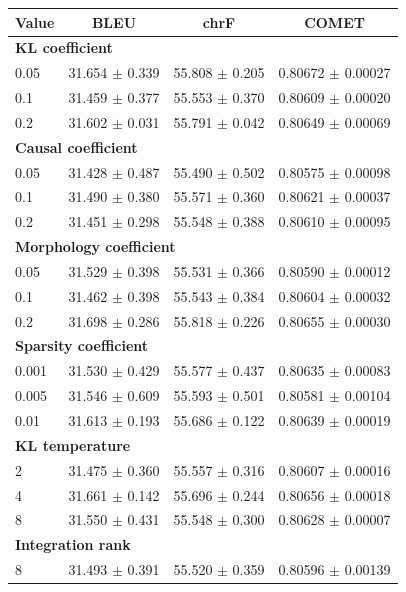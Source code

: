 \begingroup
\fontsize{7}{8.4}\selectfont
\setlength{\tabcolsep}{3pt}
\begin{tabular}{lccc}
\toprule
\textbf{Value} & \textbf{BLEU} & \textbf{chrF} & \textbf{COMET} \\
\midrule
\multicolumn{4}{l}{\textbf{KL coefficient}} \\
0.05 & 31.654 $\pm$ 0.339 & 55.808 $\pm$ 0.205 & 0.80672 $\pm$ 0.00027 \\
0.1 & 31.459 $\pm$ 0.377 & 55.553 $\pm$ 0.370 & 0.80609 $\pm$ 0.00020 \\
0.2 & 31.602 $\pm$ 0.031 & 55.791 $\pm$ 0.042 & 0.80649 $\pm$ 0.00069 \\
\multicolumn{4}{l}{\textbf{Causal coefficient}} \\
0.05 & 31.428 $\pm$ 0.487 & 55.490 $\pm$ 0.502 & 0.80575 $\pm$ 0.00098 \\
0.1 & 31.490 $\pm$ 0.380 & 55.571 $\pm$ 0.360 & 0.80621 $\pm$ 0.00037 \\
0.2 & 31.451 $\pm$ 0.298 & 55.548 $\pm$ 0.388 & 0.80610 $\pm$ 0.00095 \\
\multicolumn{4}{l}{\textbf{Morphology coefficient}} \\
0.05 & 31.529 $\pm$ 0.398 & 55.531 $\pm$ 0.366 & 0.80590 $\pm$ 0.00012 \\
0.1 & 31.462 $\pm$ 0.398 & 55.543 $\pm$ 0.384 & 0.80604 $\pm$ 0.00032 \\
0.2 & 31.698 $\pm$ 0.286 & 55.818 $\pm$ 0.226 & 0.80655 $\pm$ 0.00030 \\
\multicolumn{4}{l}{\textbf{Sparsity coefficient}} \\
0.001 & 31.530 $\pm$ 0.429 & 55.577 $\pm$ 0.437 & 0.80635 $\pm$ 0.00083 \\
0.005 & 31.546 $\pm$ 0.609 & 55.593 $\pm$ 0.501 & 0.80581 $\pm$ 0.00104 \\
0.01 & 31.613 $\pm$ 0.193 & 55.686 $\pm$ 0.122 & 0.80639 $\pm$ 0.00019 \\
\multicolumn{4}{l}{\textbf{KL temperature}} \\
2 & 31.475 $\pm$ 0.360 & 55.557 $\pm$ 0.316 & 0.80607 $\pm$ 0.00016 \\
4 & 31.661 $\pm$ 0.142 & 55.696 $\pm$ 0.244 & 0.80656 $\pm$ 0.00018 \\
8 & 31.550 $\pm$ 0.431 & 55.548 $\pm$ 0.300 & 0.80628 $\pm$ 0.00007 \\
\multicolumn{4}{l}{\textbf{Integration rank}} \\
8 & 31.493 $\pm$ 0.391 & 55.520 $\pm$ 0.359 & 0.80596 $\pm$ 0.00139 \\

\end{tabular}
